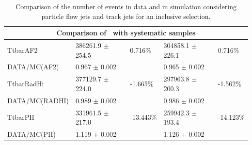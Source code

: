 \documentclass[letterpaper,12pt]{article}
\begin{document}
\begin{table}[!b]
	\centering
	\small
	\setlength\tabcolsep{5pt} 
	\begin{tabular}{|l | ll | ll |}
	\hline
	\multicolumn{5}{|c|}{Comparison of \ttbar\ with systematic samples}\\
	\hline
	TtbarAF2       &   386261.9 $\pm$ 254.5  &  0.716\% & 304858.1 $\pm$ 226.1 &  0.716\%\\
	DATA/MC(AF2)   &   0.967 $\pm$ 0.002     &      & 0.965 $\pm$ 0.002 &      \\              
	TtbarRadHi     &   377129.7 $\pm$   224.0  & -1.665\% &  297963.8 $\pm$   200.3  & -1.562\%\\     
	DATA/MC(RADHI) & 0.989 $\pm$ 0.002         &      & 0.986 $\pm$ 0.002   &  \\       
	TtbarPH        &   331961.5 $\pm$   217.0  & -13.443\%&  259942.3 $\pm$      193.4  & -14.123\%\\ 
	DATA/MC(PH)    & 1.119 $\pm$ 0.002         &       & 1.126 $\pm$ 0.002     &\\                
	\hline
	\end{tabular}
	\vspace{0.2cm}
	\caption{Comparison of the  number of events in data and in 
	simulation considering particle flow jets and track jets for an inclusive
	selection.}
	\label{tab:modelling_syst}
	\end{table}
\end{document}
